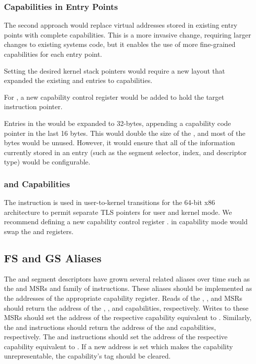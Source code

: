 \subsubsection{Capabilities in Entry Points}

The second approach would replace virtual addresses stored in
existing entry points with complete capabilities.  This is a more
invasive change, requiring larger changes to existing systems code, but
it enables the use of more fine-grained capabilities for each entry
point.

Setting the desired kernel stack pointers \CSP{} would require a new
\TSS{} layout that expanded the existing \RSP{} and \IST{} entries to
capabilities.

For , a new capability control register \CSTAR{} would be
added to hold the target instruction pointer.

Entries in the \IDT{} would be expanded to 32-bytes, appending a capability
code pointer in the last 16 bytes.  This would double the size of the
\IDT{}, and most of the bytes would be unused.  However, it would
ensure that all of the information currently stored in an \IDT{} entry
(such as the segment selector, \IST{} index, and descriptor type) would
be configurable.

\subsubsection{ and Capabilities}

The  instruction is used in user-to-kernel
transitions for the 64-bit x86 architecture to permit separate TLS
pointers for user and kernel mode.  We recommend defining a new
capability control register \KGS{}.   in capability
mode would swap the \CGS{} and \KGS{} registers.

\subsection{FS and GS Aliases}

The \FS{} and \GS{} segment descriptors have grown several related
aliases over time such as the \FSBASE{} and \GSBASE{} MSRs and
 family of instructions.  These aliases should be
implemented as the addresses of the appropriate capability register.
Reads of the \FSBASE{}, \GSBASE{}, and \KGSBASE{} MSRs should return
the address of the \CFS{}, \CGS{}, and \KGS{} capabilities,
respectively.  Writes to these MSRs should set the address of the
respective capability equivalent to .  Similarly,
the  and  instructions should
return the address of the \CFS{} and \CGS{} capabilities,
respectively.  The  and 
instructions should set the address of the respective capability
equivalent to .  If a new address is set which makes
the capability unrepresentable, the capability's tag should be
cleared.

